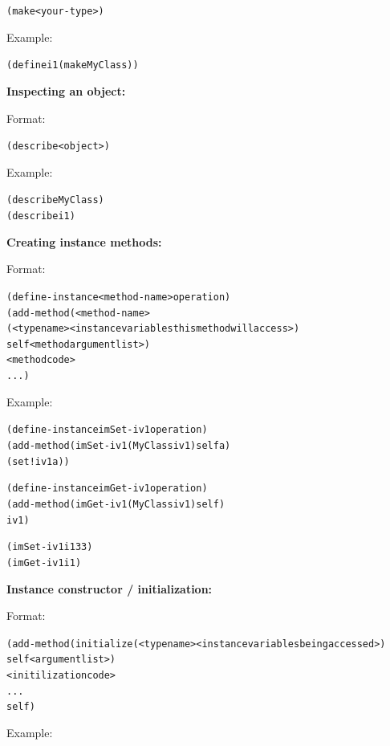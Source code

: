 \documentclass[12pt]{article}
\begin{document}
\begin{alltt}
   (make <your-type>)
\end{alltt}

Example:

\begin{alltt}
   (define i1 (make MyClass))
\end{alltt}

\textbf{Inspecting an object:}

Format:

\begin{alltt}
   (describe <object>)
\end{alltt}

Example:

\begin{alltt}
   (describe MyClass)
   (describe i1)
\end{alltt}


\textbf{Creating instance methods:}

Format:

\begin{alltt}
   (define-instance <method-name> operation)
   (add-method (<method-name>
                     (<type name>  <instance variables this method will access>)
                     self  <method argument list>)
               <method code>
               ...)
\end{alltt}

\newpage

Example:

\begin{alltt}
   (define-instance imSet-iv1 operation)
   (add-method (imSet-iv1 (MyClass iv1) self a)
               (set! iv1 a))
  
   (define-instance imGet-iv1 operation)
   (add-method (imGet-iv1 (MyClass iv1) self)
               iv1)

   (imSet-iv1 i1 33)
   (imGet-iv1 i1)
\end{alltt}


\textbf{Instance constructor / initialization:}

Format:

\begin{alltt}
   (add-method (initialize  (<type name>  <instance variables being accessed>)
                            self  <argument list>)
                     <initilization code>
                     ...
                     self)
\end{alltt}

Example:
\end{document}
